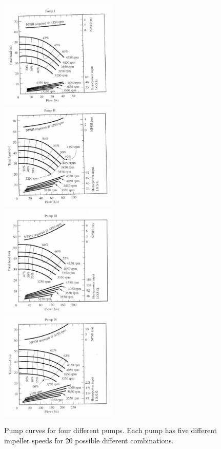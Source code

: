 \documentclass[11pt]{article}
\begin{document}
\begin{enumerate}
\begin{figure}[h]
\centering
\includegraphics[width=0.5\textwidth]{pump1.pdf}%
\includegraphics[width=0.5\textwidth]{pump2.pdf}\\%
\includegraphics[width=0.5\textwidth]{pump3.pdf}%
\includegraphics[width=0.5\textwidth]{pump4.pdf}%
\caption{Pump curves for four different pumps.  Each pump has five different impeller speeds for 20 possible different combinations.}
\label{fig:pumps}
\end{figure}


\end{enumerate}
\end{document}
